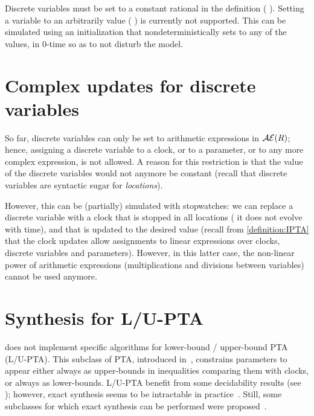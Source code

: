 Discrete variables must be set to a constant rational in the  definition (\eg{} ).
Setting a variable to an arbitrarily value (\eg{} ) is currently not supported.
This can be simulated using an initialization \IPTA{} that nondeterministically sets  to any of the values, in 0-time so as to not disturb the model.


\section{Complex updates for discrete variables}

So far, discrete variables can only be set to arithmetic expressions in $\mathcal{AE}(R)$;
hence, assigning a discrete variable to a clock, or to a parameter, or to any more complex expression, is not allowed.
A reason for this restriction is that the value of the discrete variables would not anymore be constant (recall that discrete variables are syntactic sugar for \emph{locations}).

However, this can be (partially) simulated with stopwatches: we can replace a discrete variable with a clock that is stopped in all locations (\ie{} it does not evolve with time), and that is updated to the desired value (recall from \cref{definition:IPTA} that the clock updates allow assignments to linear expressions over clocks, discrete variables and parameters).
However, in this latter case, the non-linear power of arithmetic expressions (multiplications and divisions between variables) cannot be used anymore.



\section{Synthesis for L/U-PTA}

\imitator{} does not implement specific algorithms for lower-bound / upper-bound PTA (L/U-PTA).
This subclass of PTA, introduced in~\cite{HRSV02}, constrains parameters to appear either always as upper-bounds in inequalities comparing them with clocks, or always as lower-bounds.
L/U-PTA benefit from some decidability results (see \eg{} \cite{HRSV02,BlT09,JLR15,ALime17,ALM20}); however, exact synthesis seems to be intractable in practice~\cite{JLR15,ALR16ICFEM}.
Still, some subclasses for which exact synthesis can be performed were proposed~\cite{BlT09,ALR18FORMATS}.

